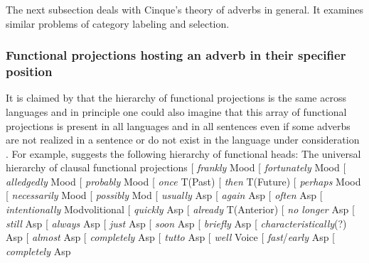 The next subsection deals with Cinque's theory of adverbs in general. It examines similar problems
of category labeling and selection.



\subsubsection{Functional projections hosting an adverb in their specifier position}
\label{sec-funct-proj-and-adverbs}
\label{sec-major-minor-category}

\largerpage
It is claimed by \citeauthor{CR2010a} that the hierarchy of functional projections is the same across
languages and in principle one could also imagine that this array of functional projections is 
present in all languages and in all sentences even if some adverbs are not realized in a sentence or
do not exist in the language under consideration \citep[]{CR2010a}. For example, \citet[]{Cinque99a-u} suggests the following hierarchy of functional heads:
\ea
\label{ex-adjunct-hierarchy}
The universal hierarchy of clausal functional projections \citep[]{Cinque99a-u}
{}[ \emph{frankly} Mood [ \emph{fortunately} Mood [ \emph{alledgedly}
Mood [ \emph{probably} Mood [ \emph{once} T(Past) [ \emph{then}
T(Future) [ \emph{perhaps}
Mood [ \emph{necessarily} Mood [ \emph{possibly} Mod [ \emph{usually}
Asp [ \emph{again} Asp [ \emph{often} Asp [ \emph{intentionally}
Mod{volitional} [ \emph{quickly} Asp [ \emph{already} T(Anterior) [ \emph{no longer}
Asp [ \emph{still} Asp [ \emph{always} Asp [ \emph{just}
Asp [ \emph{soon} Asp [ \emph{briefly} Asp [
\emph{characteristically}(?) Asp [ \emph{almost} Asp [ \emph{completely}
Asp [ \emph{tutto} Asp [ \emph{well} Voice [ \emph{fast}/\emph{early}
Asp [ \emph{completely} Asp
\z 

